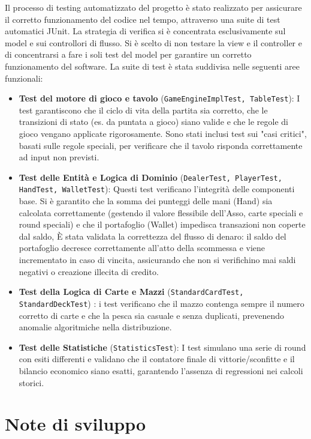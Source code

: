 \documentclass[a4paper,12pt]{report}
\begin{document}
Il processo di testing automatizzato del progetto è stato realizzato per assicurare il corretto funzionamento del codice nel tempo, attraverso una suite di test automatici JUnit.
La strategia di verifica si è concentrata esclusivamente sul model e sui controllori di flusso. Si è scelto di non testare la view e il controller e di concentrarsi a fare i soli test del model per garantire un corretto funzionamento del software.
La suite di test è stata suddivisa nelle seguenti aree funzionali:
\begin{itemize}
	\item \textbf{Test del motore di gioco e tavolo} (\texttt{GameEngineImplTest, TableTest}): I test garantiscono che il ciclo di vita della partita sia corretto, che le transizioni di stato (es. da puntata a gioco) siano valide e che le regole di gioco vengano applicate rigorosamente. 
	Sono stati inclusi test sui "casi critici", basati sulle regole speciali, per verificare che il tavolo risponda correttamente ad input non previsti.
	\item \textbf{Test delle Entità e Logica di Dominio} (\texttt{DealerTest, PlayerTest, HandTest, WalletTest}): Questi test verificano l'integrità delle componenti base. Si è garantito che la somma dei punteggi delle mani (Hand) sia calcolata correttamente (gestendo il valore flessibile dell'Asso, carte speciali e round speciali) e che il portafoglio (Wallet) 
	impedisca transazioni non coperte dal saldo, È stata validata la correttezza del flusso di denaro: il saldo del portafoglio decresce correttamente all'atto della scommessa e viene incrementato in caso di vincita, assicurando che non si verifichino mai saldi negativi o creazione illecita di credito.
	\item \textbf{Test della Logica di Carte e Mazzi} (\texttt{StandardCardTest, StandardDeckTest}) : i test verificano che il mazzo contenga sempre il numero corretto di carte e che la pesca sia casuale e senza duplicati, prevenendo anomalie algoritmiche nella distribuzione.
	\item \textbf{Test delle Statistiche} (\texttt{StatisticsTest}): I test simulano una serie di round con esiti differenti e validano che il contatore finale di vittorie/sconfitte e il bilancio economico siano esatti, garantendo l'assenza di regressioni nei calcoli storici.
\end{itemize}

\section{Note di sviluppo}
\end{document}
